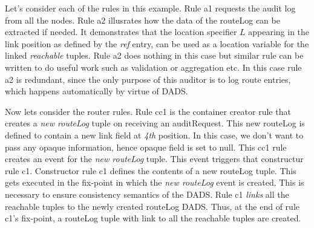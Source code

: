Let's consider each of the rules in this example. Rule a1 requests the audit log from all the nodes. Rule a2 illusrates how the data of the routeLog can be extracted if needed. It demonstrates that the location specifier $L$ appearing in the link position as defined by the {\em ref} entry, can be used as a location variable for the linked {\em reachable} tuples. Rule a2 does nothing in this case but similar rule can be written to do useful work such as validation or aggregation etc. In this case rule a2 is redundant, since the only purpose of this auditor is to log route entries, which happens automatically by virtue of DADS.

Now lets consider the router rules. Rule cc1 is the container creator rule that creates a {\em new routeLog} tuple on receiving an auditRequest. This new routeLog is defined to contain a new link field at {\em 4th} position. In this case, we don't want to pass any opaque information, hence opaque field is set to null. This cc1 rule creates an event for the {\em new routeLog} tuple. This event triggers that constructur rule c1. Constructor rule c1 defines the contents of a new routeLog tuple. This gets executed in the fix-point in which the {\em new routeLog} event is created. This is necessary to ensure consistency semantics of the DADS. Rule c1 {\em links} all the reachable tuples to the newly created routeLog DADS. Thus, at the end of rule c1's fix-point, a routeLog tuple with link to all the reachable tuples are created.


